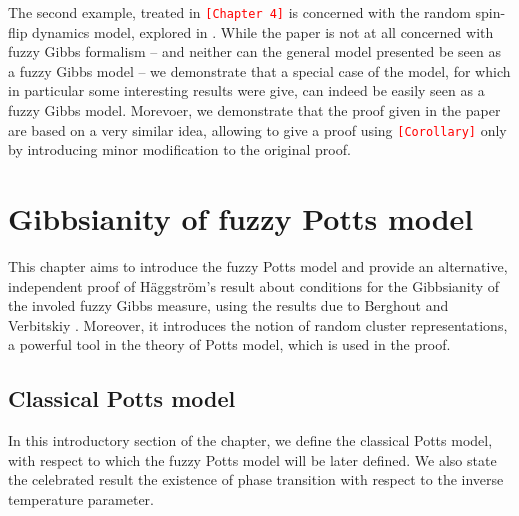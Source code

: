 \documentclass[12pt]{article}
\newcommand{\1}{\mathbbm{1}}
\newcommand{\5}{\vspace{0.5cm}}
\theoremstyle{definition}
\begin{document}
The second example, treated in \textcolor{red}{\texttt{[Chapter 4]}} is concerned with the random spin-flip dynamics model, explored in \cite{EFHR}. While the paper is not at all concerned with fuzzy Gibbs formalism -- and neither can the general model presented be seen as a fuzzy Gibbs model -- we demonstrate that a special case of the model, for which in particular some interesting results were give, can indeed be easily seen as a fuzzy Gibbs model. Morevoer, we demonstrate that the proof given in the paper are based on a very similar idea, allowing to give a proof using \textcolor{red}{\texttt{[Corollary]}} only by introducing minor modification to the original proof.


\pagebreak


\section{Gibbsianity of fuzzy Potts model}

This chapter aims to introduce the fuzzy Potts model and provide an alternative, independent proof of H\"aggstr\"om's result \cite{Hag} about conditions for the Gibbsianity of the involed fuzzy Gibbs measure, using the results due to Berghout and Verbitskiy \cite{Ber}. Moreover, it introduces the notion of random cluster representations, a powerful tool in the theory of Potts model, which is used in the proof.


\subsection{Classical Potts model}

In this introductory section of the chapter, we define the classical Potts model, with respect to which the fuzzy Potts model will be later defined. We also state the celebrated result the existence of phase transition with respect to the inverse temperature parameter. \\
\end{document}
